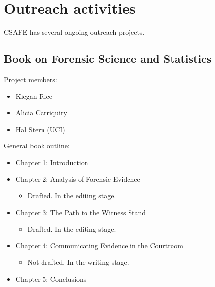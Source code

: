 \documentclass[]{book}
\providecommand{\tightlist}{%
  \setlength{\itemsep}{0pt}\setlength{\parskip}{0pt}}
\begin{document}
\hypertarget{outreach-activities}{%
\chapter{Outreach activities}\label{outreach-activities}}

CSAFE has several ongoing outreach projects.

\hypertarget{book-on-forensic-science-and-statistics}{%
\section{Book on Forensic Science and Statistics}\label{book-on-forensic-science-and-statistics}}

Project members:

\begin{itemize}
\tightlist
\item
  Kiegan Rice\\
\item
  Alicia Carriquiry\\
\item
  Hal Stern (UCI)
\end{itemize}

General book outline:

\begin{itemize}
\tightlist
\item
  Chapter 1: Introduction\\
\item
  Chapter 2: Analysis of Forensic Evidence

  \begin{itemize}
  \tightlist
  \item
    Drafted. In the editing stage.
  \end{itemize}
\item
  Chapter 3: The Path to the Witness Stand

  \begin{itemize}
  \tightlist
  \item
    Drafted. In the editing stage.
  \end{itemize}
\item
  Chapter 4: Communicating Evidence in the Courtroom

  \begin{itemize}
  \tightlist
  \item
    Not drafted. In the writing stage.
  \end{itemize}
\item
  Chapter 5: Conclusions
\end{itemize}


\end{document}

